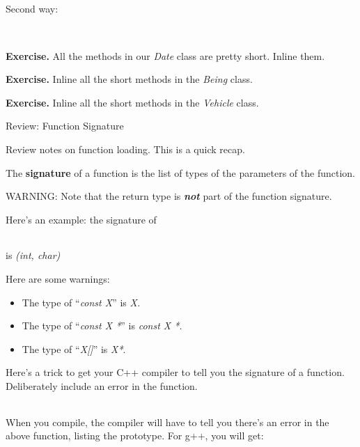 \documentclass[
]{article}
\providecommand{\tightlist}{%
  \setlength{\itemsep}{0pt}\setlength{\parskip}{0pt}}
\begin{document}
Second way:

\begin{longtable}[]{@{}@{}}
\toprule
\endhead
\bottomrule
\end{longtable}

\begin{longtable}[]{@{}@{}}
\toprule
\endhead
\bottomrule
\end{longtable}

\textbf{Exercise. }All the methods in our \emph{Date} class are pretty
short. Inline them.

\textbf{Exercise.} Inline all the short methods in the \emph{Being}
class.

\textbf{Exercise. }Inline all the short methods in the \emph{Vehicle}
class.

Review: Function Signature

Review notes on function loading. This is a quick recap.

The \textbf{signature} of a function is the list of types of the
parameters of the function.

WARNING: Note that the return type is \emph{\textbf{not}} part of the
function signature.

Here's an example: the signature of

\begin{longtable}[]{@{}@{}}
\toprule
\endhead
\bottomrule
\end{longtable}

is \emph{(int, char)}

Here are some warnings:

\begin{itemize}
\tightlist
\item
  The type of ``\emph{const X}'' is \emph{X.}
\item
  The type of ``\emph{const X *}'' is \emph{const X *.}
\item
  The type of ``\emph{X{[}{]}}'' is \emph{X*}.
\end{itemize}

Here's a trick to get your C++ compiler to tell you the signature of a
function. Deliberately include an error in the function.

\begin{longtable}[]{@{}@{}}
\toprule
\endhead
\bottomrule
\end{longtable}

When you compile, the compiler will have to tell you there's an error in
the above function, listing the prototype. For g++, you will get:
\end{document}
